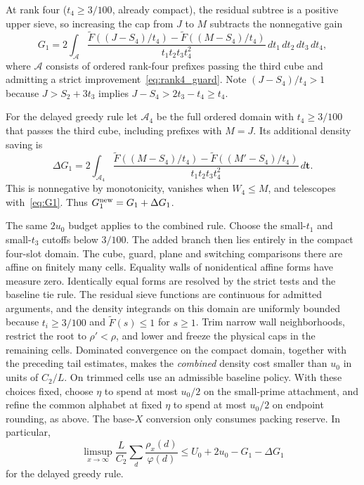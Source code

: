 \documentclass[11pt,reqno]{amsart}
\theoremstyle{remark}
\newcommand{\normF}{\widetilde{F}}
\numberwithin{equation}{section}
\begin{document}
At rank four ($t_4 \ge 3/100$, already compact), the residual subtree is a positive upper sieve, so increasing the cap from $J$ to $M$ subtracts the nonnegative gain
\begin{equation}\label{eq:G1}
G_1 = 2\int_{\mathcal{A}}
\frac{\normF((J - S_4)/t_4) - \normF((M - S_4)/t_4)}{t_1 t_2 t_3 t_4^2}\,dt_1\,dt_2\,dt_3\,dt_4,
\end{equation}
where $\mathcal{A}$ consists of ordered rank-four prefixes passing the third cube and admitting a strict improvement~\eqref{eq:rank4_guard}. Note $(J-S_4)/t_4 > 1$ because $J > S_2 + 3t_3$ implies $J - S_4 > 2t_3 - t_4 \ge t_4$.

For the delayed greedy rule let $\mathcal{A}_4$ be the full ordered domain with $t_4\ge3/100$ that passes the third cube, including prefixes with $M=J$. Its additional density saving is
\begin{equation}\label{eq:w4_gain}
\Delta G_1=2\int_{\mathcal{A}_4}
\frac{\normF((M-S_4)/t_4)-\normF((M'-S_4)/t_4)}
     {t_1t_2t_3t_4^2}\,d\mathbf t.
\end{equation}
This is nonnegative by monotonicity, vanishes when $W_4\le M$, and telescopes with~\eqref{eq:G1}. Thus $G_1^{\rm new}=G_1+\Delta G_1$.

The same $2u_0$ budget applies to the combined rule. Choose the small-$t_1$ and small-$t_3$ cutoffs below $3/100$. The added branch then lies entirely in the compact four-slot domain. The cube, guard, plane and switching comparisons there are affine on finitely many cells. Equality walls of nonidentical affine forms have measure zero. Identically equal forms are resolved by the strict tests and the baseline tie rule. The residual sieve functions are continuous for admitted arguments, and the density integrands on this domain are uniformly bounded because $t_i\ge3/100$ and $\normF(s)\le1$ for $s\ge1$. Trim narrow wall neighborhoods, restrict the root to $\rho'<\rho$, and lower and freeze the physical caps in the remaining cells. Dominated convergence on the compact domain, together with the preceding tail estimates, makes the \emph{combined} density cost smaller than $u_0$ in units of $C_2/L$. On trimmed cells use an admissible baseline policy. With these choices fixed, choose $\eta$ to spend at most $u_0/2$ on the small-prime attachment, and refine the common alphabet at fixed $\eta$ to spend at most $u_0/2$ on endpoint rounding, as above. The base-$X$ conversion only consumes packing reserve. In particular,
\[
\limsup_{x\to\infty}\frac{L}{C_2}\sum_d\frac{\rho_x(d)}{\varphi(d)}
\le U_0+2u_0-G_1-\Delta G_1
\]
for the delayed greedy rule.
\end{document}
